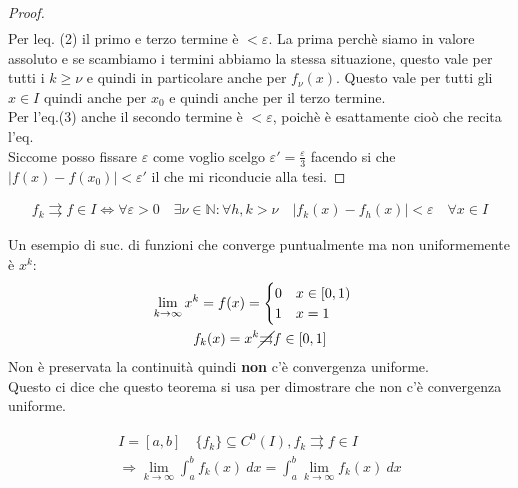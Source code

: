 \documentclass[a4paper, oneside]{article}
\begin{document}
\begin{proof}
\begin{gather*}
    \end{gather*}
    Per leq. (2) il primo e terzo termine è $< \varepsilon$. La prima perchè siamo in valore assoluto e se scambiamo i termini abbiamo la stessa situazione, questo vale per tutti i $k \geq \nu$ e quindi in particolare anche per $f_\nu(x)$. Questo vale per tutti gli $x \in I$ quindi anche per $x_0$ e quindi anche per il terzo termine.\\
    Per l'eq.(3) anche il secondo termine è $< \varepsilon$, poichè è esattamente cioò che recita l'eq.\\
    Siccome posso fissare $\varepsilon$ come voglio scelgo $\varepsilon' = \frac{\varepsilon}{3}$ facendo si che $|f(x) - f(x_0)| < \varepsilon'$ il che mi riconducie alla tesi.
\end{proof}


\begin{theorem}
  \begin{gather*}
    f_k \rightrightarrows f \in I \Leftrightarrow \forall \varepsilon > 0 \quad \exists \nu \in \mathbb{N} : \forall h,k > \nu \quad \left\lvert f_k(x) - f_h(x) \right\rvert < \varepsilon \quad \forall x \in I
  \end{gather*}
\end{theorem}


\begin{observation}
    Un esempio di suc. di funzioni che converge puntualmente ma non uniformemente è $x^k$:
  \begin{gather*}
    \lim_{k \to \infty} x^k = f(x) = \begin{cases}
        0 \quad x \in [0,1)\\
        1 \quad x = 1
    \end{cases}\\
    f_k(x) = x^k \cancel{\rightrightarrows} f \in [0,1]\\
  \end{gather*}
  Non è preservata la continuità quindi \textbf{non} c'è convergenza uniforme.\\
  Questo ci dice che questo teorema si usa per dimostrare che non c'è convergenza uniforme.
\end{observation}


\begin{theorem}
  \begin{gather*}
    I = [a,b] \quad \{ f_k \} \subseteq C^0 (I), f_k \rightrightarrows f \in I\\
    \Rightarrow \lim_{k \to \infty} \int_a^b f_k(x) \ dx = \int_a^b \lim_{k \to \infty} f_k(x) \ dx
  \end{gather*}
\end{theorem}
\end{document}
